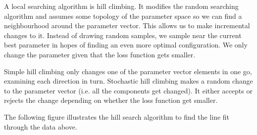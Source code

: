 \documentclass[a4paper, openany]{memoir}
\begin{document}
A local searching algorithm is hill climbing. It modifies the random searching algorithm and assumes some topology of the parameter space so we can find a neighbourhood around the parameter vector. This allows us to make incremental changes to it. Instead of drawing random samples, we sample near the current best parameter in hopes of finding an even more optimal configuration. We only change the parameter given that the loss function gets smaller.

Simple hill climbing only changes one of the parameter vector elements in one go, examining each direction in turn. Stochastic hill climbing makes a random change to the parameter vector (i.e. all the components get changed). It either accepts or rejects the change depending on whether the loss function get smaller.

The following figure illustrates the hill search algorithm to find the line fit through the data above.
\end{document}
